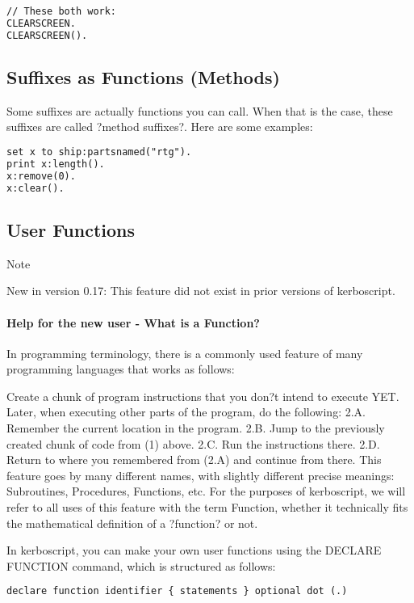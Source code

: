 \begin{lstlisting}[frame=single,language=XML]
// These both work:
CLEARSCREEN.
CLEARSCREEN().
\end{lstlisting}

\subsection{Suffixes as Functions (Methods)}
Some suffixes are actually functions you can call. When that is the case, these suffixes are called ?method suffixes?. Here are some examples:

\begin{lstlisting}[frame=single,language=XML]
set x to ship:partsnamed("rtg").
print x:length().
x:remove(0).
x:clear().
\end{lstlisting}

\subsection{User Functions}
Note

New in version 0.17: This feature did not exist in prior versions of kerboscript.
\paragraph{Help for the new user - What is a Function?}
In programming terminology, there is a commonly used feature of many programming languages that works as follows:

Create a chunk of program instructions that you don?t intend to execute YET.
Later, when executing other parts of the program, do the following:
2.A. Remember the current location in the program.
2.B. Jump to the previously created chunk of code from (1) above.
2.C. Run the instructions there.
2.D. Return to where you remembered from (2.A) and continue from there.
This feature goes by many different names, with slightly different precise meanings: Subroutines, Procedures, Functions, etc. For the purposes of kerboscript, we will refer to all uses of this feature with the term Function, whether it technically fits the mathematical definition of a ?function? or not.

In kerboscript, you can make your own user functions using the DECLARE FUNCTION command, which is structured as follows:

\begin{lstlisting}[frame=single,language=XML]
declare function identifier { statements } optional dot (.)
\end{lstlisting}

